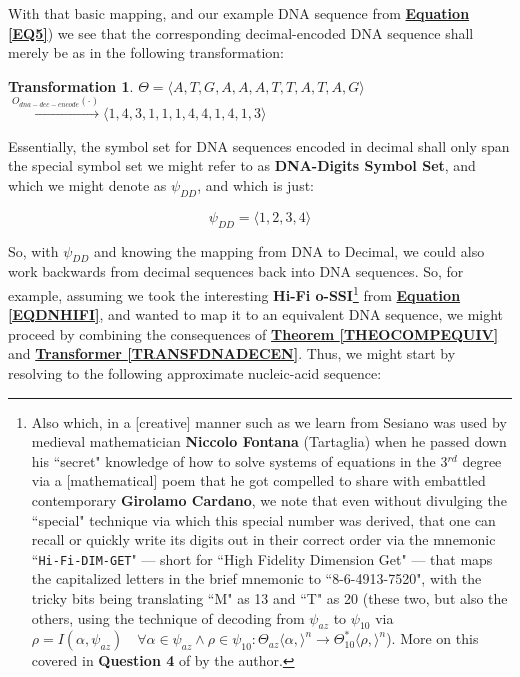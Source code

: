 \documentclass[a4paper, 18pt]{book} %
\newtheorem{trans}{Transformation}
\begin{document}
With that basic mapping, and our example DNA sequence from \textbf{\hyperref[EQ5]{Equation \ref{EQ5}}}) we see that the corresponding decimal-encoded DNA sequence shall merely be as in the following transformation:

\vspace{1em}
\begin{trans}
\label{TRANSSEQATG}
$\Theta = \langle  A, T, G, A, A, A, T, T, A, T, A, G \rangle$\\
$ \xrightarrow{O_{dna-dec-encode}(\cdot)} \langle  1, 4, 3, 1, 1, 1, 4, 4, 1, 4, 1, 3 \rangle$
\end{trans}
\vspace{1em}

Essentially, the symbol set for DNA sequences encoded in decimal shall only span the special symbol set we might refer to as \textbf{DNA-Digits Symbol Set}, and which we might denote as $\psi_{DD}$, and which is just:

\vspace{1em}
\begin{equation}
\label{EQDNADIGSS}
\psi_{DD} = \langle 1, 2, 3, 4 \rangle
\end{equation}
\vspace{1em}


So, with $\psi_{DD}$ and knowing the mapping from DNA to Decimal, we could also work backwards from decimal sequences back into DNA sequences. So, for example, assuming we took the interesting \textbf{Hi-Fi o-SSI}\footnote{Also which, in a [creative] manner such as we learn from Sesiano\cite{Sesiano2009} was used by medieval mathematician \textbf{Niccolo Fontana} (Tartaglia) when he passed down his ``secret" knowledge of how to solve systems of equations in the 3$^{rd}$ degree via a [mathematical] poem that he got compelled to share with embattled contemporary \textbf{Girolamo Cardano}, we note that even without divulging the ``special" technique via which this special number was derived\cite{ossipaper}, that one can recall or quickly write its digits out in their correct order via the mnemonic ``\texttt{Hi-Fi-DIM-GET}" --- short for ``High Fidelity Dimension Get" --- that maps the capitalized letters in the brief mnemonic to ``8-6-4913-7520", with the tricky bits being translating ``M" as 13 and ``T" as 20 (these two, but also the others, using the technique of decoding from $\psi_{az}$ to $\psi_{10}$ via $\rho = I(\alpha,\psi_{az}) \quad \forall \alpha \in \psi_{az} \land \rho \in \psi_{10} : \Theta_{az}\langle \alpha, \rangle^n \rightarrow \Theta^*_{10}\langle \rho, \rangle^n$). More on this covered in \textbf{Question 4} of \cite{transformatics_interview} by the author.} from \textbf{\hyperref[EQDNHIFI]{Equation \ref{EQDNHIFI}}}, and wanted to map it to an equivalent DNA sequence, we might proceed by combining the consequences of \textbf{\hyperref[THEOCOMPEQUIV]{Theorem \ref{THEOCOMPEQUIV}}} and  \textbf{\hyperref[TRANSFDNADECEN]{Transformer \ref{TRANSFDNADECEN}}}. Thus, we might start by resolving to the following approximate nucleic-acid sequence:
\end{document}
